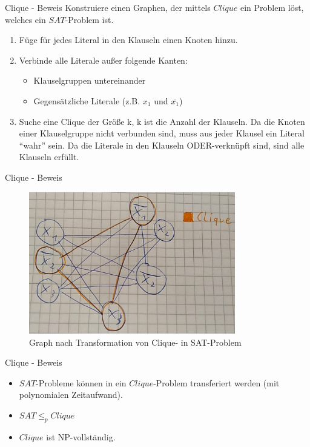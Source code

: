 \documentclass[12pt,donthandout,notes=dontshow,xcolor=table]{beamer}
\begin{document}
\begin{frame}{Clique - Beweis}
Konstruiere einen Graphen, der mittels \(Clique\) ein Problem löst, welches ein \(SAT\)-Problem ist.
\begin{enumerate}
\item Füge für jedes Literal in den Klauseln einen Knoten hinzu.
\pause
\item Verbinde alle Literale außer folgende Kanten:
\begin{itemize}
\item Klauselgruppen untereinander
\item Gegensätzliche Literale (z.B. \(x_1\) und \(\overline{x_1}\))
\end{itemize}
\pause
\item Suche eine Clique der Größe k, k ist die Anzahl der Klauseln. Da die Knoten einer Klauselgruppe nicht verbunden sind, muss aus jeder Klausel ein Literal ``wahr'' sein. Da die Literale in den Klauseln ODER-verknüpft sind, sind alle Klauseln erfüllt.\\
\end{enumerate}
\end{frame}

\begin{frame}{Clique - Beweis}
\begin{figure}
\includegraphics[width=9cm]{figures/clique_sat}
\caption{Graph nach Transformation von Clique- in SAT-Problem}
\end{figure}
\end{frame}

\begin{frame}{Clique - Beweis}
\begin{itemize}
\item \(SAT\)-Probleme können in ein \(Clique\)-Problem transferiert werden (mit polynomialen Zeitaufwand).\\
\item \(SAT \leq_p Clique\)\\
\item \(Clique\) ist NP-vollständig.
\end{itemize}
\end{frame}
\end{document}
